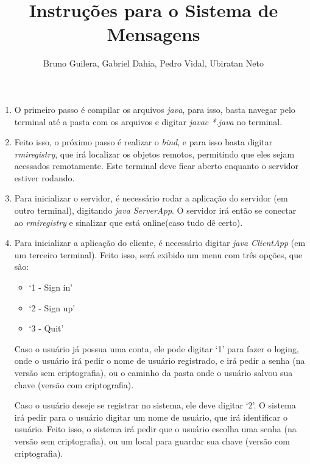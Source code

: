 \documentclass{article}
\title{Instruções para o Sistema de Mensagens}
\author{Bruno Guilera, Gabriel Dahia, Pedro Vidal, Ubiratan Neto}
\begin{document}
 
\maketitle
 
\begin{enumerate}

\item O primeiro passo é compilar os arquivos \textit{java}, para isso, basta navegar pelo terminal até a pasta com os arquivos e digitar \textit{javac *.java} no terminal.

\item Feito isso, o próximo passo é realizar o \textit{bind}, e para isso basta digitar \textit{rmiregistry}, que irá localizar os objetos remotos, permitindo que eles sejam acessados remotamente. Este terminal deve ficar aberto enquanto o servidor estiver rodando.

\item Para inicializar o servidor, é necessário rodar a aplicação do servidor (em outro terminal), digitando \textit{java ServerApp}. O servidor irá então se conectar ao \textit{rmiregistry} e sinalizar que está online(caso tudo dê certo).

\item Para inicializar a aplicação do cliente, é necessário digitar \textit{java ClientApp} (em um terceiro terminal). Feito isso, será exibido um menu com três opções, que são:

\begin{itemize}

\item `1 - Sign in'

\item `2 - Sign up'

\item `3 - Quit'

\end{itemize}

Caso o usuário já possua uma conta, ele pode digitar `1' para fazer o loging, onde o usuário irá pedir o nome de usuário registrado, e irá pedir a senha (na versão sem criptografia), ou o caminho da pasta onde o usuário salvou sua chave (versão com criptografia).

Caso o usuário deseje se registrar no sistema, ele deve digitar `2'. O sistema irá pedir para o usuário digitar um nome de usuário, que irá identificar o usuário. Feito isso, o sistema irá pedir que o usuário escolha uma senha (na versão sem criptografia), ou um local para guardar sua chave (versão com criptografia).


\end{enumerate}
\end{document}

